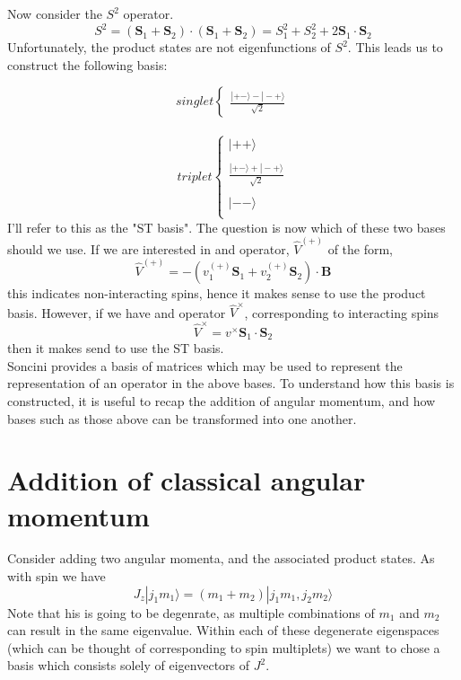 \documentclass[12pt]{article}
\begin{document}
\noindent Now consider the $S^{2}$ operator. 
\begin{equation}
S^{2} = (\mathbf{S}_{1}+\mathbf{S}_{2})\cdot (\mathbf{S}_{1}+\mathbf{S}_{2})= 
S^{2}_{1}+S^{2}_{2} + 2\mathbf{S}_{1}\cdot \mathbf{S}_{2}
\end{equation}
\noindent Unfortunately, the product states are not eigenfunctions of $S^{2}$.
This leads us to construct the following basis:

\begin{equation*}
singlet
\begin{cases}
\frac{|+-\rangle - | -+ \rangle}{\sqrt{2}}
\end{cases}
\end{equation*}
\\
\begin{equation*}
triplet
\begin{cases}
|++\rangle\\ \\
\frac{|+-\rangle + | -+ \rangle}{\sqrt{2}}\\ \\ 
|--\rangle\\
\end{cases}
\end{equation*}
\noindent I'll refer to this as the "ST basis". The question is now which of
these two bases should we use. If we are interested in and operator,
$\hat{V}^{(+)}$ of the form,
\begin{equation}
\hat{V}^{(+)} = -(v^{(+)}_{1}\mathbf{S}_{1} + v^{(+)}_{2}\mathbf{S}_{2}) \cdot \mathbf{B}
\end{equation}
this indicates non-interacting spins, hence it makes sense to use the product
basis.  However, if we have and operator $\hat{V}^{\times}$, corresponding to 
interacting spins
\begin{equation}
\hat{V}^{\times} = v^{\times}\mathbf{S}_{1}\cdot\mathbf{S}_{2}
\end{equation}
then it makes send to use the ST basis.\\

\noindent Soncini provides a basis of matrices which may be used to represent
the representation of an operator in the above bases. To understand how this
basis is constructed, it is useful to recap the addition of angular momentum,
and how bases such as those above can be transformed into one another. 

\section{Addition of classical angular momentum}
Consider adding two angular momenta, and the associated product states. As
with spin we have
\begin{equation}
J_{z}|j_{1}m_{1} \rangle = (m_{1}+m_{2})|j_{1}m_{1}, j_{2}m_{2} \rangle
\end{equation}
Note that his is going to be degenrate, as multiple combinations of $m_{1}$ and
$m_{2}$ can result in the same eigenvalue. Within each of these degenerate
eigenspaces (which can be thought of corresponding to spin multiplets) we want
to chose a basis which consists solely of eigenvectors of $J^{2}$.\\
\end{document}
